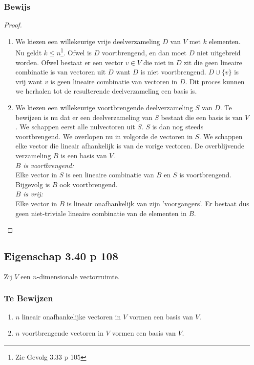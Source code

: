 \documentclass[lineaire_algebra_oplossingen.tex]{subfiles}
\begin{document}
\subsubsection*{Bewijs}
\begin{proof}
\begin{enumerate}
\item
We kiezen een willekeurige vrije deelverzameling $D$ van $V$ met $k$ elementen. Nu geldt $k\le n$\footnote{Zie Gevolg 3.33 p 105}. Ofwel is $D$ voortbrengend, en dan moet $D$ niet uitgebreid worden. Ofwel bestaat er een vector $v\in V$ die niet in $D$ zit die geen lineaire combinatie is van vectoren uit $D$ want $D$ is niet voortbrengend. $D \cup \{v\}$ is vrij want $v$ is geen lineaire combinatie van vectoren in $D$. Dit proces kunnen we herhalen tot de resulterende deelverzameling een basis is.
\item
We kiezen een willekeurige voortbrengende deelverzameling $S$ van $D$. Te bewijzen is nu dat er een deelverzameling van $S$ bestaat die een basis is van $V$. We schappen eerst alle nulvectoren uit $S$. $S$ is dan nog steeds voortbrengend. We overlopen nu in volgorde de vectoren in $S$. We schappen elke vector die lineair afhankelijk is van de vorige vectoren. De overblijvende verzameling $B$ is een basis van $V$.\\
\emph{$B$ is voortbrengend:}\\
Elke vector in $S$ is een lineaire combinatie van $B$ en $S$ is voortbrengend. Bijgevolg is $B$ ook voortbrengend.\\
\emph{$B$ is vrij:}\\
Elke vector in $B$ is lineair onafhankelijk van zijn 'voorgangers'. Er bestaat dus geen niet-triviale lineaire combinatie van de elementen in $B$.
\end{enumerate}
\end{proof}

\subsection{Eigenschap 3.40 p 108}
Zij $V$ een $n$-dimensionale vectorruimte.
\subsubsection*{Te Bewijzen}
\begin{enumerate}
\item $n$ lineair onafhankelijke vectoren in $V$ vormen een basis van $V$.
\item $n$ voortbrengende vectoren in $V$ vormen een basis van $V$.
\end{enumerate}
\end{document}
